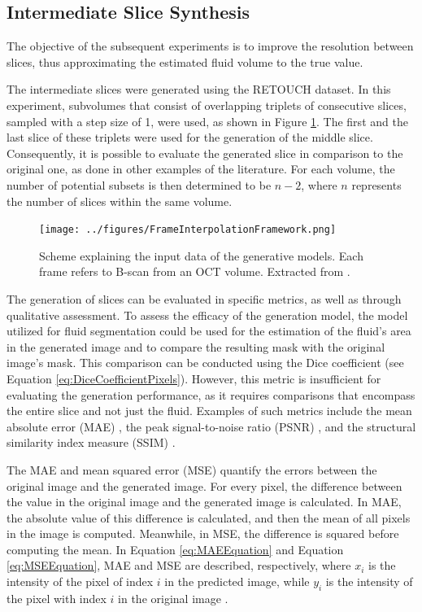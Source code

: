 \subsection{Intermediate Slice Synthesis}
The objective of the subsequent experiments is to improve the resolution between slices, thus approximating the estimated fluid volume to the true value.
\par
The intermediate slices were generated using the RETOUCH dataset. In this experiment, subvolumes that consist of overlapping triplets of consecutive slices, sampled with a step size of 1, were used, as shown in Figure \ref{fig:FrameInterpolationFramework}. The first and the last slice of these triplets were used for the generation of the middle slice. Consequently, it is possible to evaluate the generated slice in comparison to the original one, as done in other examples of the literature. For each volume, the number of potential subsets is then determined to be $n-2$, where $n$ represents the number of slices within the same volume.

\begin{figure}[!ht]
	\centering
	\texttt{[image: ../figures/FrameInterpolationFramework.png]}
	\caption{Scheme explaining the input data of the generative models. Each frame refers to B-scan from an OCT volume. Extracted from \textcite{Tran2020}.}
	\label{fig:FrameInterpolationFramework}
\end{figure}

The generation of slices can be evaluated in specific metrics, as well as through qualitative assessment. To assess the efficacy of the generation model, the model utilized for fluid segmentation could be used for the estimation of the fluid's area in the generated image and to compare the resulting mask with the original image's mask. This comparison can be conducted using the Dice coefficient \parencite{Lopez2023} (see Equation \ref{eq:DiceCoefficientPixels}). However, this metric is insufficient for evaluating the generation performance, as it requires comparisons that encompass the entire slice and not just the fluid. Examples of such metrics include the mean absolute error (MAE) \parencite{Lopez2023, Wu2022, Zhang2022}, the peak signal-to-noise ratio (PSNR) \parencite{Xia2021, YChen2018, Sanchez2018, Fang2022, Nimitha2024, Kudo2019, You2020, Zhang2024, Zhang2022}, and the structural similarity index measure (SSIM) \parencite{YChen2018, Sanchez2018, Fang2022, Nimitha2024, Kudo2019, You2020, Zhang2024, Zhang2022}.
\par
The MAE and mean squared error (MSE) quantify the errors between the original image and the generated image. For every pixel, the difference between the value in the original image and the generated image is calculated. In MAE, the absolute value of this difference is calculated, and then the mean of all pixels in the image is computed. Meanwhile, in MSE, the difference is squared before computing the mean. In Equation \ref{eq:MAEEquation} and Equation \ref{eq:MSEEquation}, MAE and MSE are described, respectively, where $x_{i}$ is the intensity of the pixel of index $i$ in the predicted image, while $y_{i}$ is the intensity of the pixel with index $i$ in the original image \parencite{Sara2019, Rajkumar2016}.

